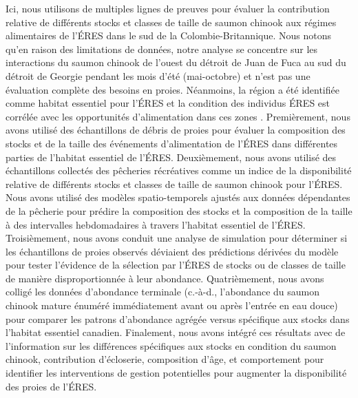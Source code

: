 Ici, nous utilisons de multiples lignes de preuves pour évaluer la contribution relative de différents stocks et classes de taille de saumon chinook aux régimes alimentaires de l'ÉRES dans le sud de la Colombie-Britannique. Nous notons qu'en raison des limitations de données, notre analyse se concentre sur les interactions du saumon chinook de l'ouest du détroit de Juan de Fuca au sud du détroit de Georgie pendant les mois d'été (mai-octobre) et n'est pas une évaluation complète des besoins en proies. Néanmoins, la région a été identifiée comme habitat essentiel pour l'ÉRES \citep{dfoIdentificationHabitatsSpecial2017} et la condition des individus ÉRES est corrélée avec les opportunités d'alimentation dans ces zones \citep{ettingerShiftingPhenologyEndangered2022, stewartSurvivalFattestLinking2021, stewartTraditionalSummerHabitat2023}. Premièrement, nous avons utilisé des échantillons de débris de proies pour évaluer la composition des stocks et de la taille des événements d'alimentation de l'ÉRES dans différentes parties de l'habitat essentiel de l'ÉRES. Deuxièmement, nous avons utilisé des échantillons collectés des pêcheries récréatives comme un indice de la disponibilité relative de différents stocks et classes de taille de saumon chinook pour l'ÉRES. Nous avons utilisé des modèles spatio-temporels ajustés aux données dépendantes de la pêcherie pour prédire la composition des stocks et la composition de la taille à des intervalles hebdomadaires à travers l'habitat essentiel de l'ÉRES. Troisièmement, nous avons conduit une analyse de simulation pour déterminer si les échantillons de proies observés déviaient des prédictions dérivées du modèle pour tester l'évidence de la sélection par l'ÉRES de stocks ou de classes de taille de manière disproportionnée à leur abondance. Quatrièmement, nous avons colligé les données d'abondance terminale (c.-à-d., l'abondance du saumon chinook mature énuméré immédiatement avant ou après l'entrée en eau douce) pour comparer les patrons d'abondance agrégée versus spécifique aux stocks dans l'habitat essentiel canadien. Finalement, nous avons intégré ces résultats avec de l'information sur les différences spécifiques aux stocks en condition du saumon chinook, contribution d'écloserie, composition d'âge, et comportement pour identifier les interventions de gestion potentielles pour augmenter la disponibilité des proies de l'ÉRES.